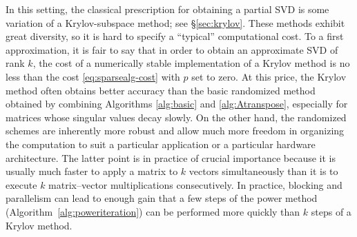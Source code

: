 \documentclass[final]{siamltex}
\begin{document}
In this setting, the classical prescription for obtaining a partial SVD
is some variation of a Krylov-subspace method; see \S\ref{sec:krylov}.
These methods exhibit great diversity, so it is hard to specify
a ``typical'' computational cost.
To a first approximation, it is fair to say
that in order to obtain an approximate SVD of rank $k$, the cost of
a numerically stable implementation of a Krylov method is no less than
the cost \eqref{eq:sparsealg-cost} with $p$ set to zero. At this price,
the Krylov method often obtains better accuracy than the basic
randomized method obtained by combining Algorithms \ref{alg:basic} and
\ref{alg:Atranspose}, especially for matrices whose singular values decay
slowly. On the other hand, the randomized schemes are inherently more robust
and allow much more freedom in organizing the computation to suit a particular
application or a particular hardware architecture. The latter point is in
practice of crucial importance because it is usually much faster to apply a
matrix to $k$ vectors simultaneously than it is to execute $k$ matrix--vector
multiplications consecutively.  In practice, blocking and parallelism can lead
to enough gain that a few steps of the power method (Algorithm~\ref{alg:poweriteration})
can be performed more quickly than $k$ steps of a Krylov method.

\lsp
\end{document}
